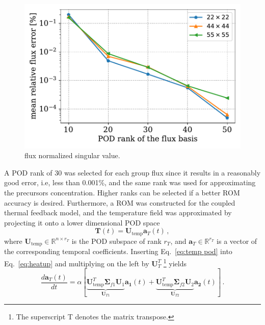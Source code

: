 \documentclass[review,number,sort&compress,12pt]{elsarticle}
\begin{document}
\begin{figure}[h!]
	\includegraphics[width=1.0\linewidth]{../figures/flux_rank_convergence.pdf}
	\caption{flux normalized singular value.}
	\label{fig:POD flux rank}
\end{figure}
A POD rank of 30 was selected for each group flux since it results in a reasonably good error, i.e, less than 0.001\%, and the same rank was used for approximating the precursors concentration.
Higher ranks can be selected if a better ROM accuracy is desired.
Furthermore, a ROM was constructed for the coupled thermal feedback model, and the temperature field was approximated by projecting it onto a lower dimensional POD space
\begin{equation}
\mathbf{T}(t) = \mathbf{U}_{\text{temp}}\mathbf{a}_T(t) \, ,
\label{eq:temp pod}
\end{equation}
where $\mathbf{U}_{\text{temp}}\in\mathbb{R}^{n \times r_T} $ is the POD subspace of rank $r_T$, and $\mathbf{a}_T\in \mathbb{R}^{r_T}$ is a vector of the corresponding temporal coefficients. 
Inserting Eq.~\ref{eq:temp pod} into Eq.~\ref{eq:heatup} and multiplying on the left by $\mathbf{U}_T^T$ \footnote{The superscript T denotes the matrix transpose.} yields
\begin{equation}
\frac{d\mathbf{a}_T(t)}{dt}  = \alpha [\underbrace{\mathbf{U}_{\text{temp}}^T \boldsymbol{\Sigma}_{f1}\mathbf{U}_1}_{\mathbf{U}_{T1}}\mathbf{a_1}(t) + \underbrace{\mathbf{U}_{\text{temp}}^T\boldsymbol{\Sigma}_{f2}\mathbf{U}_2}_{\mathbf{U}_{T2}}\mathbf{a_2}(t)] \, .
\label{eq:reduced temp}
\end{equation}
\end{document}
